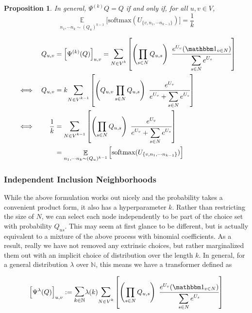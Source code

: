 \documentclass{article}
\newtheorem{prop}{Proposition}
\theoremstyle{definition}
\begin{document}
	\begin{prop}
		In general, $\Psi^{(k)}Q = Q$ if and only if, for all $u, v \in V$, \[\displaystyle\mathop{\mathbb E}\limits_{n_1, \cdots n_k \sim (Q_u)^{k-1}} \Big[\mathrm{softmax}(U_{\{v, n_1, \cdots n_{k-1}\}})\Big] = \frac{1}{k}\]
	\end{prop}
	\begin{prf}
		\begin{align*}
			&&Q_{u,v} &= \Big[\Psi^{(k)}(Q)\Big]_{u,v} = \mathlarger{\sum}_{N \in V^{k}} \left[\left(\prod_{s \in N}Q_{u,s}\right) ~\cfrac{ e^{U_v}  (\mathbbm 1_{v \in N})}{ \displaystyle \sum\limits_{ s \in N } e^{U_s} } \right] \\
			&\iff& Q_{u,v} &= k \mathlarger{\sum}_{N \in V^{k-1}} \left[\left(Q_{u,v}\prod_{s \in N}Q_{u,s}\right) ~\cfrac{ e^{U_v} }{ \displaystyle e^{U_v}+\sum\limits_{ s \in N } e^{U_s} } \right] \\
			&\iff& \frac{1}{k} &=\mathlarger{\sum}_{N \in V^{k-1}} \left[\left(\prod_{s \in N}Q_{u,s}\right) ~\cfrac{ e^{U_v} }{ \displaystyle e^{U_v}+\sum\limits_{ s \in N } e^{U_s} } \right] \\
			&& &= \mathop{\mathbb E}\limits_{n_1, \cdots n_k \sim (Q_u)^{k-1}} \Big[\mathrm{softmax}(U_{\{v, n_1, \cdots n_{k-1}\}})\Big]
		\end{align*}
	\end{prf}


	\subsubsection{Independent Inclusion Neighborhoods}
	While the above formulation works out nicely and the probability takes a convenient product form, it also has a hyperparameter $k$. Rather than restricting the size of $N$, we can select each node independently to be part of the choice set with probability $Q_{us}$. This may seem at first glance to be different, but is actually equivalent to a mixture of the above process with binomial coefficients. As a result, really we have not removed any extrinsic choices, but rather marginalized them out with an implicit choice of distribution over the length $k$. In general, for a general distribution $\lambda$ over $\mathbb N$, this means we have a transformer defined as 
	
	\begin{equation*}
		\Big[\Psi^{\lambda}(Q)\Big]_{u,v} := \mathlarger{\mathlarger\sum}_{k \in \mathbb N} \lambda(k) \mathlarger{\sum}_{N \in V^{k}} \left[\left(\prod_{s \in N}Q_{u,s}\right) ~\cfrac{ e^{U_v}  (\mathbbm 1_{v \in N})}{ \displaystyle \sum\limits_{ s \in N } e^{U_s} } \right]
	\end{equation*}
	
\end{document}
